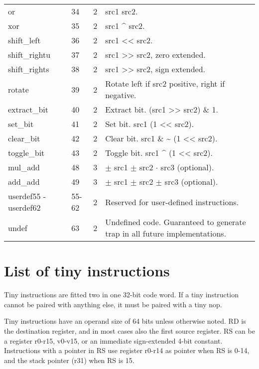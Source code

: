 \documentclass[forwardcom.tex]{subfiles}
\begin{document}
\begin{longtable} {|p{18mm}|p{9mm}|p{9mm}|p{76mm}|}
or           & 34 & 2 & src1 \textbar{} src2. \\
xor          & 35 & 2 & src1 \^{} src2. \\
shift\_left  & 36 & 2 & src1 \textless\textless{} src2.  \\
shift\_rightu& 37 & 2 & src1 \textgreater\textgreater{} src2, zero extended. \\
shift\_rights& 38 & 2 & src1 \textgreater\textgreater{} src2, sign extended. \\
rotate       & 39 & 2 & Rotate left if src2 positive, right if negative. \\
extract\_bit & 40 & 2 & Extract bit. (src1 \textgreater\textgreater{} src2) \& 1. \\
set\_bit     & 41 & 2 & Set bit. src1 \textbar{} (1 \textless\textless{} src2). \\
clear\_bit   & 42 & 2 & Clear bit. src1 \& \~{} (1 \textless\textless{} src2). \\
toggle\_bit  & 43 & 2 & Toggle bit. src1 \^{} (1 \textless\textless{} src2). \\
mul\_add     & 48 & 3 & $\pm$ src1 $\pm$ src2 $\cdot$ src3 (optional). \\
add\_add     & 49 & 3 & $\pm$ src1 $\pm$ src2 $\pm$ src3 (optional). \\
userdef55 - userdef62
             & 55-62 & 2 & Reserved for user-defined instructions. \\
undef        & 63 & 2 & Undefined code. Guaranteed to generate trap in all future implementations. \\
\hline
\end{longtable}


\section{List of tiny instructions}
Tiny instructions are fitted two in one 32-bit code word. If a tiny instruction cannot be paired with anything else, it must be paired with a tiny nop.
\vspace{2mm}

Tiny instructions have an operand size of 64 bits unless otherwise noted. RD is the destination register, and in most cases also the first source register. RS can be a register r0-r15, v0-v15, or an immediate sign-extended 4-bit constant. Instructions with a pointer in RS use register r0-r14 as pointer when RS is 0-14, and the stack pointer (r31) when RS is 15.
\vspace{2mm}
\end{document}
